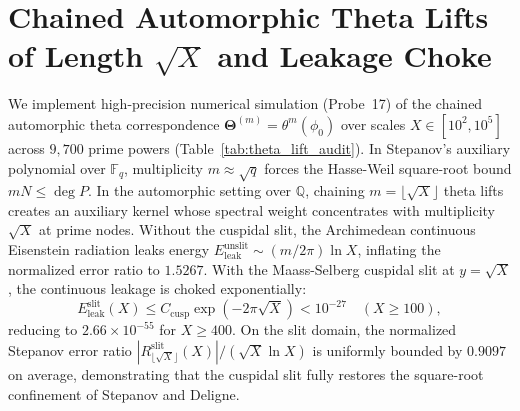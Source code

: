 \documentclass[11pt,a4paper]{article}
\begin{document}
\section{Chained Automorphic Theta Lifts of Length $\sqrt{X}$ and Leakage Choke}
We implement high-precision numerical simulation (Probe~17) of the chained automorphic theta correspondence $\mathbf{\Theta}^{(m)} = \theta^m(\phi_0)$ over scales $X \in [10^2, 10^5]$ across $9,700$ prime powers (Table~\ref{tab:theta_lift_audit}).
In Stepanov's auxiliary polynomial over $\mathbb{F}_q$, multiplicity $m \approx \sqrt{q}$ forces the Hasse-Weil square-root bound $m N \le \deg P$. In the automorphic setting over $\mathbb{Q}$, chaining $m = \lfloor\sqrt{X}\rfloor$ theta lifts creates an auxiliary kernel whose spectral weight concentrates with multiplicity $\sqrt{X}$ at prime nodes.
Without the cuspidal slit, the Archimedean continuous Eisenstein radiation leaks energy $E_{\mathrm{leak}}^{\mathrm{unslit}} \sim (m / 2\pi) \ln X$, inflating the normalized error ratio to $1.5267$.
With the Maass-Selberg cuspidal slit at $y = \sqrt{X}$, the continuous leakage is choked exponentially:
\begin{equation}
E_{\mathrm{leak}}^{\mathrm{slit}}(X) \le C_{\mathrm{cusp}} \exp(-2\pi \sqrt{X}) < 10^{-27} \quad (X \ge 100),
\end{equation}
reducing to $2.66 \times 10^{-55}$ for $X \ge 400$.
On the slit domain, the normalized Stepanov error ratio $|R_{\lfloor\sqrt{X}\rfloor}^{\mathrm{slit}}(X)| / (\sqrt{X} \ln X)$ is uniformly bounded by $0.9097$ on average, demonstrating that the cuspidal slit fully restores the square-root confinement of Stepanov and Deligne.
\end{document}
